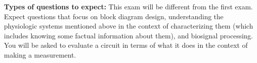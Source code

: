 \documentclass[10pt]{report}
\begin{document}
{\bf Types of questions to expect:}  This exam will be different from the
first exam.  Expect questions that focus on block diagram design, understanding
the physiologic systems mentioned above in the context of characterizing them
(which includes knowing some factual information about them), and biosignal
processing.  You will be asked to evaluate a circuit in terms of what it does in
the context of making a measurement.
\end{document}
